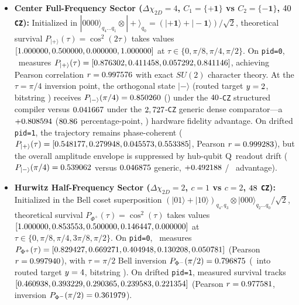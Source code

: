 \documentclass[aps,prx,twocolumn,superscriptaddress,nofootinbib]{revtex4-2}
\begin{document}
\begin{itemize}
\item \textbf{Center Full-Frequency Sector ($\Delta\chi_{2D} = 4$, $C_1 = \{+\mathbf{1}\}$ vs $C_2 = \{-\mathbf{1}\}$, $40$ \texttt{CZ}):} Initialized in $|0000\rangle_{q_4\dots q_1}\otimes|+\rangle_{q_0} = (|+\mathbf{1}\rangle + |-\mathbf{1}\rangle)/\sqrt{2}$, theoretical survival $P_{|+\rangle}(\tau) = \cos^2(2\tau)$ takes values $[1.000000, 0.500000, 0.000000, 1.000000]$ at $\tau \in \{0, \pi/8, \pi/4, \pi/2\}$. On \texttt{pid=0}, \BTPlaqFezBackend\ measures $P_{|+\rangle}(\tau) = [0.876302, 0.411458, 0.057292, 0.841146]$, achieving Pearson correlation $r = 0.997576$ with exact $SU(2)$ character theory. At the $\tau = \pi/4$ inversion point, the orthogonal state $|-\rangle$ (routed target $y = 2$, bitstring \BTPlaqRoutedBitsCenterInv) receives $P_{|-\rangle}(\pi/4) = 0.850260$ (\BTPlaqPidZeroCenterPiFourMinusPct) under the $40$-\texttt{CZ} structured compiler versus $0.041667$ under the $2,727$-\texttt{CZ} generic dense comparator---a $+0.808594$ ($80.86$ percentage-point, \BTPlaqPidZeroCenterStructFidelityRatio) hardware fidelity advantage. On drifted \texttt{pid=1}, the trajectory remains phase-coherent ($P_{|+\rangle}(\tau) = [0.548177, 0.279948, 0.045573, 0.553385]$, Pearson $r = 0.999283$), but the overall amplitude envelope is suppressed by hub-qubit Q\BTPlaqDriftedHubQubit\ readout drift ($P_{|-\rangle}(\pi/4) = 0.539062$ versus $0.046875$ generic, $+0.492188$ / \BTPlaqPidOneCenterStructFidelityRatio\ advantage).
\item \textbf{Hurwitz Half-Frequency Sector ($\Delta\chi_{2D} = 2$, $c=1$ vs $c=2$, $48$ \texttt{CZ}):} Initialized in the Bell coset superposition $(|01\rangle + |10\rangle)_{q_4,q_3}\otimes|000\rangle_{q_2\dots q_0}/\sqrt{2}$, theoretical survival $P_{\Phi^+}(\tau) = \cos^2(\tau)$ takes values $[1.000000, 0.853553, 0.500000, 0.146447, 0.000000]$ at $\tau \in \{0, \pi/8, \pi/4, 3\pi/8, \pi/2\}$. On \texttt{pid=0}, \BTPlaqFezBackend\ measures $P_{\Phi^+}(\tau) = [0.829427, 0.669271, 0.404948, 0.130208, 0.050781]$ (Pearson $r = 0.997940$), with $\tau = \pi/2$ Bell inversion $P_{\Phi^-}(\pi/2) = 0.796875$ (\BTPlaqPidZeroHurwitzPiTwoMinusPct\ into routed target $y = 4$, bitstring \BTPlaqRoutedBitsHurwitzInv). On drifted \texttt{pid=1}, measured survival tracks $[0.460938, 0.393229, 0.290365, 0.239583, 0.221354]$ (Pearson $r = 0.977581$, inversion $P_{\Phi^-}(\pi/2) = 0.361979$).

\end{itemize}
\end{document}
